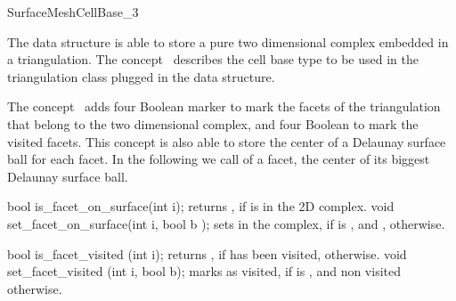 

\begin{ccRefConcept}{SurfaceMeshCellBase_3}


\ccDefinition
  
The  data structure is able to store
a pure two dimensional complex embedded in a triangulation.
The concept \ccRefName\ describes the cell base type
to be used  in the  triangulation class    plugged in 
the  data structure.


\ccGeneralizes
{}

The concept \ccRefName\ adds four Boolean marker to mark the facets
of the triangulation that belong to the two dimensional complex,
and four Boolean to mark the visited facets.
This concept is also able to store the center of a Delaunay surface
ball for each facet.  In the following we call 
of a facet, the center of its biggest Delaunay surface ball.

\ccTypes


\ccCreation
{}  %



\ccOperations

\ccMethod
{bool is_facet_on_surface(int i);}
{returns , if  is in the 2D complex. }
\ccGlue
\ccMethod
{void set_facet_on_surface(int i, bool b );}
{sets  in the complex, if  is ,
and , otherwise.}


\ccMethod
{bool is_facet_visited (int i);}
{returns , if  has been visited,
 otherwise.}
\ccGlue
\ccMethod
{void set_facet_visited (int i, bool b);} 
{marks  as visited, if  is ,
 and non visited otherwise.}



\end{ccRefConcept}
